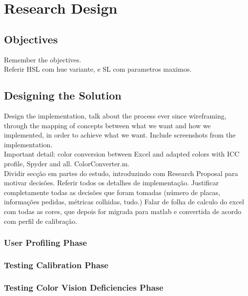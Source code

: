 
\chapter{Research Design}
\label{chapter:design}

\section{Objectives}
\label{sec:impl_objectives}
Remember the objectives. \\
Referir HSL com hue variante, e SL com parametros maximos.

\section{Designing the Solution}
\label{sec:impl_designingsolution}
Design the implementation, talk about the process ever since wireframing, through the mapping of concepts between
what we want and how we implemented, in order to achieve what we want. Include screenshots from the implementation. \\

Important detail: color conversion between Excel and adapted colors with ICC profile, Spyder and all. ColorConverter.m. \\
%
Dividir secção em partes do estudo, introduzindo com Research Proposal para motivar decisões. Referir todos os detalhes de implementação.
Justificar completamente todas as decisões que foram tomadas (número de placas, informações pedidas, métricas colhidas, tudo.)
%
Falar de folha de calculo do excel com todas as cores, que depois for migrada para matlab
e convertida de acordo com perfil de calibração.
%
\subsection{User Profiling Phase}
\label{subsec:design_profiling}
%
\subsection{Testing Calibration Phase}
\label{subsec:design_calibration}
%
\subsection{Testing Color Vision Deficiencies Phase}
\label{subsec:design_ishihara}
%
